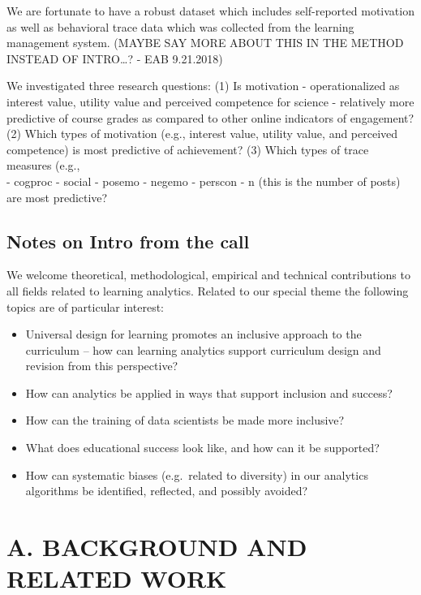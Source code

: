 \documentclass[]{apa6}
\providecommand{\tightlist}{%
  \setlength{\itemsep}{0pt}\setlength{\parskip}{0pt}}
\theoremstyle{definition}
\theoremstyle{definition}
\theoremstyle{definition}
\theoremstyle{remark}
\begin{document}
We are fortunate to have a robust dataset which includes self-reported
motivation as well as behavioral trace data which was collected from the
learning management system. (MAYBE SAY MORE ABOUT THIS IN THE METHOD
INSTEAD OF INTRO\ldots{}? - EAB 9.21.2018)

We investigated three research questions: (1) Is motivation -
operationalized as interest value, utility value and perceived
competence for science - relatively more predictive of course grades as
compared to other online indicators of engagement? (2) Which types of
motivation (e.g., interest value, utility value, and perceived
competence) is most predictive of achievement? (3) Which types of trace
measures (e.g.,\\
- cogproc - social - posemo - negemo - perscon - n (this is the number
of posts) are most predictive?

\subsection{Notes on Intro from the
call}\label{notes-on-intro-from-the-call}

We welcome theoretical, methodological, empirical and technical
contributions to all fields related to learning analytics. Related to
our special theme the following topics are of particular interest:

\begin{itemize}
\tightlist
\item
  Universal design for learning promotes an inclusive approach to the
  curriculum -- how can learning analytics support curriculum design and
  revision from this perspective?
\item
  How can analytics be applied in ways that support inclusion and
  success?
\item
  How can the training of data scientists be made more inclusive?
\item
  What does educational success look like, and how can it be supported?
\item
  How can systematic biases (e.g.~related to diversity) in our analytics
  algorithms be identified, reflected, and possibly avoided?
\end{itemize}

\section{A. BACKGROUND AND RELATED
WORK}\label{a.-background-and-related-work}
\end{document}
